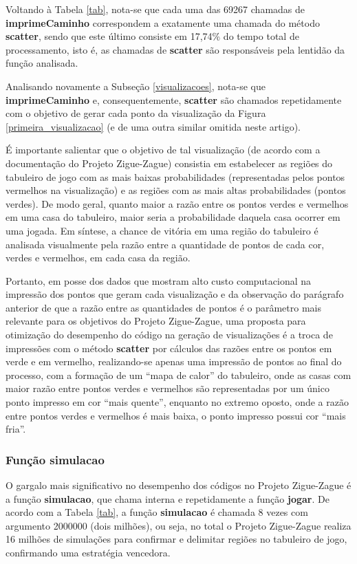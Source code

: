 \documentclass[12pt]{article}
\newcommand{\aspas}[1]{``#1''} %
\begin{document}
Voltando à Tabela \ref{tab}, nota-se que cada uma das 69267 chamadas de \textbf{imprimeCaminho} correspondem a exatamente uma chamada do método \textbf{scatter}, sendo que este último consiste em 17,74\% do tempo total de processamento, isto é, as chamadas de \textbf{scatter} são responsáveis pela lentidão da função analisada.

Analisando novamente a Subseção \ref{visualizacoes}, nota-se que \textbf{imprimeCaminho} e, consequentemente, \textbf{scatter} são chamados repetidamente com o objetivo de gerar cada ponto da visualização da Figura \ref{primeira_visualizacao} (e de uma outra similar omitida neste artigo). 

É importante salientar que o objetivo de tal visualização (de acordo com a documentação do Projeto Zigue-Zague) consistia em estabelecer as regiões do tabuleiro de jogo com as mais baixas probabilidades (representadas pelos pontos vermelhos na visualização) e as regiões com as mais altas probabilidades (pontos verdes). De modo geral, quanto maior a razão entre os pontos verdes e vermelhos em uma casa do tabuleiro, maior seria a probabilidade daquela casa ocorrer em uma jogada. Em síntese, a chance de vitória em uma região do tabuleiro é analisada visualmente pela razão entre a quantidade de pontos de cada cor, verdes e vermelhos, em cada casa da região.

Portanto, em posse dos dados que mostram alto custo computacional na impressão dos pontos que geram cada visualização e da observação do parágrafo anterior de que a razão entre as quantidades de pontos é o parâmetro mais relevante para os objetivos do Projeto Zigue-Zague, uma proposta para otimização do desempenho do código na geração de visualizações é a troca de impressões com o método \textbf{scatter} por cálculos das razões entre os pontos em verde e em vermelho, realizando-se apenas uma impressão de pontos ao final do processo, com a formação de um \aspas{mapa de calor} do tabuleiro, onde as casas com maior razão entre pontos verdes e vermelhos são representadas por um único ponto impresso em cor \aspas{mais quente}, enquanto no extremo oposto, onde a razão entre pontos verdes e vermelhos é mais baixa, o ponto impresso possui cor \aspas{mais fria}.

\subsubsection{Função \textbf{simulacao}}
\label{simulacao}

O gargalo mais significativo no desempenho dos códigos no Projeto Zigue-Zague é a função \textbf{simulacao}, que chama interna e repetidamente a função \textbf{jogar}. De acordo com a Tabela \ref{tab}, a função \textbf{simulacao} é chamada 8 vezes com argumento 2000000 (dois milhões), ou seja, no total o Projeto Zigue-Zague realiza 16 milhões de simulações para confirmar e delimitar regiões no tabuleiro de jogo, confirmando uma estratégia vencedora.
\end{document}

